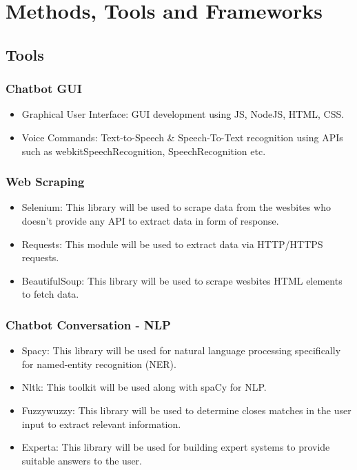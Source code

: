 \section{Methods, Tools and Frameworks}

\subsection{Tools}
\subsubsection{Chatbot GUI}
\begin{itemize}
    \item Graphical User Interface: GUI development using JS, NodeJS, HTML, CSS.
    \item Voice Commands: Text-to-Speech \& Speech-To-Text recognition using APIs such as webkitSpeechRecognition, SpeechRecognition etc. 
\end{itemize}
\subsubsection{Web Scraping}
\begin{itemize}
    \item Selenium: This library will be used to scrape data from the wesbites who doesn't provide any API to extract data in form of response.
    \item Requests: This module will be used to extract data via HTTP/HTTPS requests.
    \item BeautifulSoup: This library will be used to scrape wesbites HTML elements to fetch data.
\end{itemize}
\subsubsection{Chatbot Conversation - NLP}\label{Sec: Methods/NLP}
    \begin{itemize}
        \item Spacy: This library will be used for natural language processing specifically for named-entity recognition (NER).
        \item Nltk: This toolkit will be used along with spaCy for NLP.
        \item Fuzzywuzzy: This library will be used to determine closes matches in the user input to extract relevant information.
        \item Experta: This library will be used for building expert systems to provide suitable answers to the user.
    \end{itemize}

